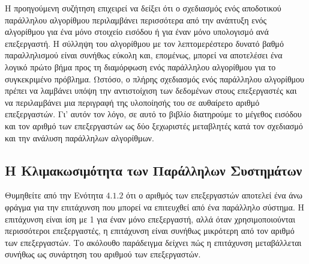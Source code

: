 \documentclass[12pt,a4paper]{article}
\begin{document}
Η προηγούμενη συζήτηση επιχειρεί να δείξει ότι ο σχεδιασμός ενός 
αποδοτικού παράλληλου αλγορίθμου περιλαμβάνει περισσότερα από την 
ανάπτυξη ενός αλγορίθμου για ένα μόνο στοιχείο εισόδου ή για έναν μόνο 
υπολογισμό ανά επεξεργαστή. Η σύλληψη του αλγορίθμου με τον λεπτομερέστερο 
δυνατό βαθμό παραλληλισμού είναι συνήθως εύκολη και, επομένως, μπορεί να 
αποτελέσει ένα λογικό πρώτο βήμα προς τη διαμόρφωση ενός παράλληλου 
αλγορίθμου για το συγκεκριμένο πρόβλημα. Ωστόσο, ο πλήρης σχεδιασμός ενός 
παράλληλου αλγορίθμου πρέπει να λαμβάνει υπόψη την αντιστοίχιση των 
δεδομένων στους επεξεργαστές και να περιλαμβάνει μια περιγραφή της 
υλοποίησής του σε αυθαίρετο αριθμό επεξεργαστών. Γι’ αυτόν τον λόγο, σε 
αυτό το βιβλίο διατηρούμε το μέγεθος εισόδου και τον αριθμό των 
επεξεργαστών ως δύο ξεχωριστές μεταβλητές κατά τον σχεδιασμό και την 
ανάλυση παράλληλων αλγορίθμων.

\subsection{Η Κλιμακωσιμότητα των Παράλληλων Συστημάτων}
Θυμηθείτε από την Ενότητα $4.1.2$ ότι ο αριθμός των επεξεργαστών αποτελεί 
ένα άνω φράγμα για την επιτάχυνση που μπορεί να επιτευχθεί από ένα 
παράλληλο σύστημα. Η επιτάχυνση είναι ίση με 1 για έναν μόνο επεξεργαστή, 
αλλά όταν χρησιμοποιούνται περισσότεροι επεξεργαστές, η επιτάχυνση είναι 
συνήθως μικρότερη από τον αριθμό των επεξεργαστών. Το ακόλουθο παράδειγμα 
δείχνει πώς η επιτάχυνση μεταβάλλεται συνήθως ως συνάρτηση του αριθμού 
των επεξεργαστών.
\end{document}
